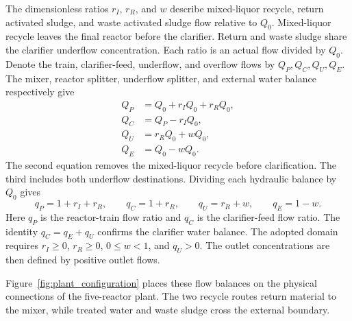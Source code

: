 The dimensionless ratios $r_I$, $r_R$, and $w$ describe mixed-liquor recycle, return activated sludge, and waste activated sludge flow relative to $Q_0$. Mixed-liquor recycle leaves the final reactor before the clarifier. Return and waste sludge share the clarifier underflow concentration. Each ratio is an actual flow divided by $Q_0$. Denote the train, clarifier-feed, underflow, and overflow flows by $Q_P,Q_C,Q_U,Q_E$. The mixer, reactor splitter, underflow splitter, and external water balance respectively give
\begin{align}
Q_P&=Q_0+r_IQ_0+r_RQ_0,\\
Q_C&=Q_P-r_IQ_0,\\
Q_U&=r_RQ_0+wQ_0,\\
Q_E&=Q_0-wQ_0.
\end{align}
The second equation removes the mixed-liquor recycle before clarification. The third includes both underflow destinations. Dividing each hydraulic balance by $Q_0$ gives
\begin{equation}
q_P=1+r_I+r_R,\qquad q_C=1+r_R,\qquad
q_U=r_R+w,\qquad q_E=1-w.
\label{eq:plant_flows}
\end{equation}
Here $q_P$ is the reactor-train flow ratio and $q_C$ is the clarifier-feed flow ratio. The identity $q_C=q_E+q_U$ confirms the clarifier water balance. The adopted domain requires $r_I\ge0$, $r_R\ge0$, $0\le w<1$, and $q_U>0$. The outlet concentrations are then defined by positive outlet flows.

Figure~\ref{fig:plant_configuration} places these flow balances on the physical connections of the five-reactor plant. The two recycle routes return material to the mixer, while treated water and waste sludge cross the external boundary.

